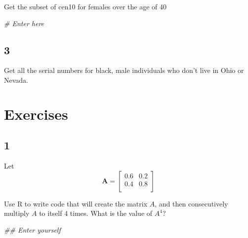 \documentclass[]{book}
\newenvironment{Shaded}{\begin{snugshade}}{\end{snugshade}}
\newcommand{\CommentTok}[1]{\textcolor[rgb]{0.56,0.35,0.01}{\textit{#1}}}
\newcommand{\NormalTok}[1]{#1}
\newcommand{\OperatorTok}[1]{\textcolor[rgb]{0.81,0.36,0.00}{\textbf{#1}}}
\newcommand{\StringTok}[1]{\textcolor[rgb]{0.31,0.60,0.02}{#1}}
\theoremstyle{definition}
\theoremstyle{definition}
\theoremstyle{definition}
\theoremstyle{remark}
\begin{document}
\begin{Shaded}
\begin{Highlighting}[]
\begin{Shaded}
\begin{Highlighting}[]
Get the subset of cen10 for females over the age of 40

\begin{Shaded}
\begin{Highlighting}[]
\CommentTok{\# Enter here}
\end{Highlighting}
\end{Shaded}

\hypertarget{section-8}{%
\subsection*{3}\label{section-8}}

Get all the serial numbers for black, male individuals who don't live in Ohio or Nevada.

\begin{Shaded}
\end{Shaded}

\hypertarget{exercises-1}{%
\section*{Exercises}\label{exercises-1}}

\hypertarget{section-9}{%
\subsection*{1}\label{section-9}}

Let
\[\mathbf{A} = \left[\begin{array}
{rrr}
0.6 & 0.2\\
0.4 & 0.8\\
\end{array}\right]
\]

Use R to write code that will create the matrix \(A\), and then consecutively multiply \(A\) to itself 4 times. What is the value of \(A^{4}\)?

\begin{Shaded}
\begin{Highlighting}[]
\CommentTok{## Enter yourself}
\end{Highlighting}
\end{Shaded}


\end{Highlighting}
\end{Shaded}
\end{Highlighting}
\end{Shaded}
\end{document}
